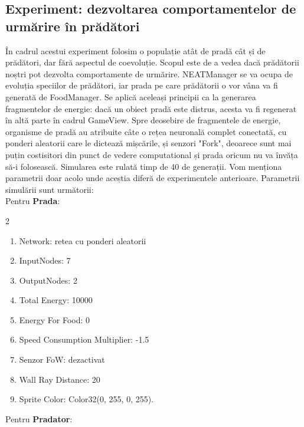 \subsection{Experiment: dezvoltarea comportamentelor de urmărire în prădători}\label{ParametersChasing}
În cadrul acestui experiment folosim o populație atât de pradă cât și de prădători, dar fără aspectul de coevoluție.
Scopul este de a vedea dacă prădătorii noștri pot dezvolta comportamente de urmărire.
NEATManager se va ocupa de evoluția speciilor de prădători, iar prada pe care prădătorii o vor vâna va fi generată de FoodManager.
Se aplică aceleași principii ca la generarea fragmentelor de energie: dacă un obiect pradă este distrus, acesta va fi regenerat în altă parte în cadrul GameView.
Spre deosebire de fragmentele de energie, organisme de pradă au atribuite câte o rețea neuronală complet conectată, cu ponderi aleatorii care le dictează mișcările, și senzori "Fork", deoarece sunt mai puțin costisitori din punct de vedere computational și prada oricum nu va învăța să-i folosească.
Simularea este rulată timp de 40 de generații. Vom menționa parametrii doar acolo unde aceștia diferă de experimentele anterioare.
Parametrii simulării sunt următorii:\\
Pentru \textbf{Prada}:
\begin{multicols}{2}
    \begin{enumerate}
        \item Network: retea cu ponderi aleatorii
        \item InputNodes: 7
        \item OutputNodes: 2
        \item Total Energy: 10000
        \item Energy For Food: 0
        \item Speed Consumption Multiplier: -1.5
        \item Senzor FoW: dezactivat
        \item Wall Ray Distance: 20
        \item Sprite Color: Color32(0, 255, 0, 255).
    \end{enumerate}
\end{multicols}
Pentru \textbf{Pradator}:

